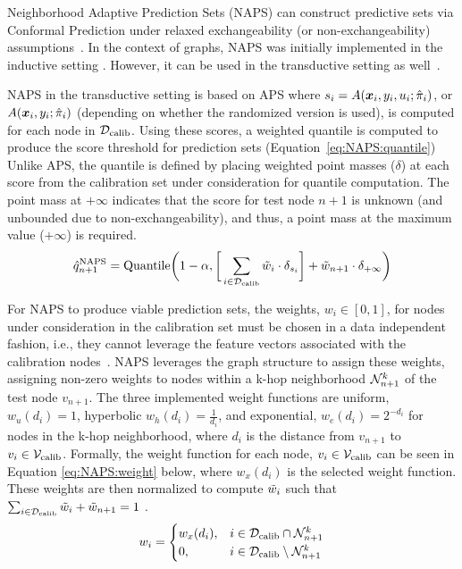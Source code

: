 Neighborhood Adaptive Prediction Sets (NAPS) can construct predictive sets via Conformal Prediction under relaxed exchangeability (or non-exchangeability) assumptions~\cite{barber2023conformal}.
In the context of graphs, NAPS was initially implemented in the inductive setting \cite{clarkson2023distribution}.
However, it can be used in the transductive setting as well~\cite{zargarbashi23conformal}. 


NAPS in the transductive setting is based on APS where $s_i = A({\bm{x}}_i, y_i, u_i;\hat{\pi}_i)$, or $A({\bm{x}}_i, y_i;\hat{\pi}_i)$ (depending on whether the randomized version is used), is computed for each node in ${\mathcal{D}}_{\text{calib}}$. 
Using these scores, a weighted quantile is computed to produce the score threshold for prediction sets (Equation~\ref{eq:NAPS:quantile})
Unlike APS, the quantile is defined by placing weighted point masses ($\delta$) at each score from the calibration set under consideration for quantile computation.
The point mass at $+\infty$ indicates that the score for test node $n+1$ is unknown (and unbounded due to non-exchangeability), and thus, a point mass at the maximum value ($+\infty$) is required.%
\begin{align}
    \hat{q}^{\text{NAPS}}_{n+1} = \text{Quantile}\bigg(1-\alpha, \bigg[\sum_{i\in{\mathcal{D}}_{\text{calib}}}\Tilde{w}_{i}\cdot \delta_{s_{i}}\bigg] + \Tilde{w}_{n+1}\cdot \delta_{+\infty}\bigg)
    \label{eq:NAPS:quantile}
\end{align}

For NAPS to produce viable prediction sets, the weights, $w_i\in [0,1]$, for nodes under consideration in the calibration set must be chosen in a data independent fashion, i.e., they cannot leverage the feature vectors associated with the calibration nodes~\citep{barber2023conformal}.
NAPS leverages the graph structure to assign these weights, assigning non-zero weights to nodes within a k-hop neighborhood ${\mathcal{N}}_{n+1}^k$ of the test node $v_{n+1}$.
The three implemented weight functions are uniform, $w_u(d_i) = 1$, hyperbolic $w_h(d_i) = \frac{1}{d_i}$, and exponential, $w_e(d_i) = 2^{-d_i}$ for nodes in the k-hop neighborhood, where $d_i$ is the distance from $v_{n+1}$ to $v_i \in {\mathcal{V}}_{\text{calib}}$.
Formally, the weight function for each node, $v_i \in {\mathcal{V}}_{\text{calib}}$ can be seen in Equation \ref{eq:NAPS:weight} below, where $w_x(d_i)$ is the selected weight function.
These weights are then normalized to compute $\Tilde{w}_i$ such that $\sum_{i\in{\mathcal{D}}_{\text{calib}}} \Tilde{w}_i + \Tilde{w}_{n+1} = 1$ \cite{barber2023conformal}.
\begin{align}
    w_i = \begin{cases}
w_x(d_i), & i\in {\mathcal{D}}_{\text{calib}}\cap\mathcal{N}_{n+1}^k\\
0,& i\in {\mathcal{D}}_{\text{calib}}\setminus\mathcal{N}_{n+1}^k
\end{cases}
    \label{eq:NAPS:weight}
\end{align}

